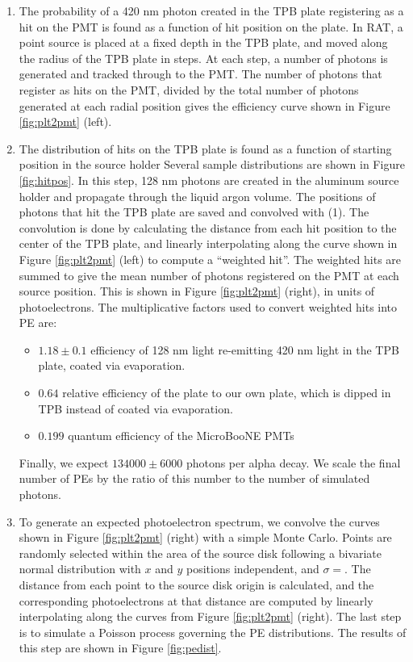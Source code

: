 \documentclass[aps,pra,notitlepage,groupedaddress]{revtex4-1}
\begin{document}
\begin{enumerate}
	\item The probability of a 420 nm photon created in the TPB plate registering as a hit on the PMT is found as a function of hit position on the plate. In RAT, a point source is placed at a fixed depth in the TPB plate, and moved along the radius of the TPB plate in steps. At each step, a number of photons is generated and tracked through to the PMT. The number of photons that register as hits on the PMT, divided by the total number of photons generated at each radial position gives the efficiency curve shown in Figure \ref{fig:plt2pmt} (left).
	
	\item The distribution of hits on the TPB plate is found as a function of starting position in the source holder Several sample distributions are shown in Figure \ref{fig:hitpos}. In this step, 128 nm photons are created in the aluminum source holder and propagate through the liquid argon volume. The positions of photons that hit the TPB plate are saved and convolved with (1). The convolution is done by calculating the distance from each hit position to the center of the TPB plate, and linearly interpolating along the curve shown in Figure \ref{fig:plt2pmt} (left) to compute a ``weighted hit''. The weighted hits are summed to give the mean number of photons registered on the PMT at each source position. This is shown in Figure \ref{fig:plt2pmt} (right), in units of photoelectrons. The multiplicative factors used to convert weighted hits into PE are:
	
	\begin{itemize}
		\item $1.18 \pm 0.1$ efficiency of 128 nm light re-emitting 420 nm light in the TPB plate, coated via evaporation.
		\item $0.64$ relative efficiency of the plate to our own plate, which is dipped in TPB instead of coated via evaporation.
		\item $0.199$ quantum efficiency of the MicroBooNE PMTs
	\end{itemize}
	
	Finally, we expect $134000 \pm 6000$ photons per alpha decay. We scale the final number of PEs by the ratio of this number to the number of simulated photons.
	
	\item To generate an expected photoelectron spectrum, we convolve the curves shown in Figure \ref{fig:plt2pmt} (right) with a simple Monte Carlo. Points are randomly selected within the area of the source disk following a bivariate normal distribution with $x$ and $y$ positions independent, and $\sigma=$. The distance from each point to the source disk origin is calculated, and the corresponding photoelectrons at that distance are computed by linearly interpolating along the curves from Figure \ref{fig:plt2pmt} (right).  The last step is to simulate a Poisson process governing the PE distributions. The results of this step are shown in Figure \ref{fig:pedist}.
\end{enumerate}
\end{document}

